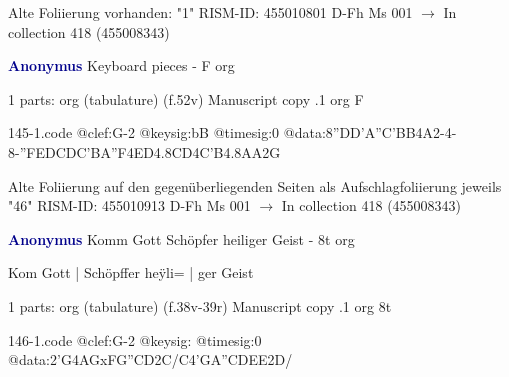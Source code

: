 \documentclass[twocolumn]{book}
\begin{document}
\newline Alte Foliierung vorhanden: "1"
\newline RISM-ID: 455010801
\newline D-Fh  Ms 001
\newline $\rightarrow$ In collection 418 (455008343)
      
\newline \par \vspace{7pt} \textcolor{darkblue}{\textbf{Anonymus  }}
\newline Keyboard pieces - F
\newline org
\newline \begin{itshape}\end{itshape} 
\newline \textcolor{darkblue}{}  1 parts: org (tabulature)  (f.52v)
\newline Manuscript copy
.1  org  F  
\begin{filecontents*}{145-1.code}
@clef:G-2
@keysig:bB
@timesig:0
@data:{8''DD'A''C}{'BB}4A2-4-8-''F{EDCD}{C'BA''F}4ED4.8CD4C'B4.8AA2G
\end{filecontents*}
\newline
%

\newline Alte Foliierung auf den gegenüberliegenden Seiten als Aufschlagfoliierung jeweils "46"
\newline RISM-ID: 455010913
\newline D-Fh  Ms 001
\newline $\rightarrow$ In collection 418 (455008343)
      
\newline \par \vspace{7pt} \textcolor{darkblue}{\textbf{Anonymus  }}
\newline Komm Gott Schöpfer heiliger Geist - 8t
\newline org
\newline \begin{itshape}[f.38v, at left:] Kom Gott | Schöpffer heÿli= | ger Geist\end{itshape} 
\newline \textcolor{darkblue}{}  1 parts: org (tabulature)  (f.38v-39r)
\newline Manuscript copy
.1  org  8t  
\begin{filecontents*}{146-1.code}
@clef:G-2
@keysig:
@timesig:0
@data:2'G4AGxFG''CD2C/C4'GA''CDEE2D/
\end{filecontents*}
\newline
%
\end{document}
